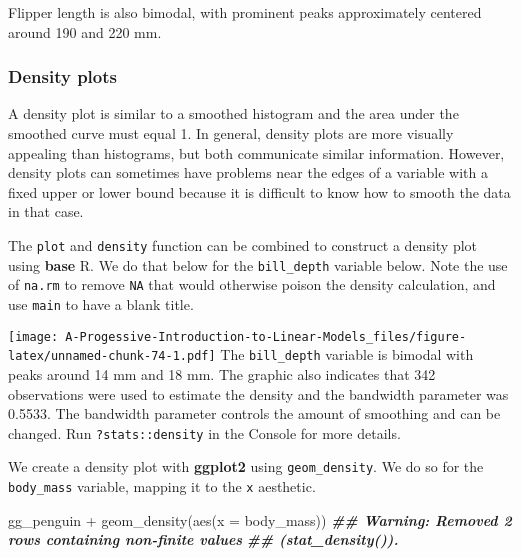 \documentclass[
]{book}
\newenvironment{Shaded}{\begin{snugshade}}{\end{snugshade}}
\newcommand{\AttributeTok}[1]{\textcolor[rgb]{0.77,0.63,0.00}{#1}}
\newcommand{\ConstantTok}[1]{\textcolor[rgb]{0.00,0.00,0.00}{#1}}
\newcommand{\DocumentationTok}[1]{\textcolor[rgb]{0.56,0.35,0.01}{\textbf{\textit{#1}}}}
\newcommand{\FunctionTok}[1]{\textcolor[rgb]{0.00,0.00,0.00}{#1}}
\newcommand{\NormalTok}[1]{#1}
\newcommand{\SpecialCharTok}[1]{\textcolor[rgb]{0.00,0.00,0.00}{#1}}
\newcommand{\StringTok}[1]{\textcolor[rgb]{0.31,0.60,0.02}{#1}}
\theoremstyle{definition}
\theoremstyle{definition}
\theoremstyle{definition}
\theoremstyle{definition}
\theoremstyle{remark}
\begin{document}
Flipper length is also bimodal, with prominent peaks approximately centered around 190 and 220 mm.

\hypertarget{density-plots}{%
\subsubsection{Density plots}\label{density-plots}}

A density plot is similar to a smoothed histogram and the area under the smoothed curve must equal 1. In general, density plots are more visually appealing than histograms, but both communicate similar information. However, density plots can sometimes have problems near the edges of a variable with a fixed upper or lower bound because it is difficult to know how to smooth the data in that case.

The \texttt{plot} and \texttt{density} function can be combined to construct a density plot using \textbf{base} R. We do that below for the \texttt{bill\_depth} variable below. Note the use of \texttt{na.rm} to remove \texttt{NA} that would otherwise poison the density calculation, and use \texttt{main} to have a blank title.

\begin{Shaded}
\end{Shaded}

\texttt{[image: A-Progessive-Introduction-to-Linear-Models\_files/figure-latex/unnamed-chunk-74-1.pdf]}
The \texttt{bill\_depth} variable is bimodal with peaks around 14 mm and 18 mm. The graphic also indicates that 342 observations were used to estimate the density and the bandwidth parameter was 0.5533. The bandwidth parameter controls the amount of smoothing and can be changed. Run \texttt{?stats::density} in the Console for more details.

We create a density plot with \textbf{ggplot2} using \texttt{geom\_density}. We do so for the \texttt{body\_mass} variable, mapping it to the \texttt{x} aesthetic.

\begin{Shaded}
\begin{Highlighting}[]
\NormalTok{gg\_penguin }\SpecialCharTok{+} \FunctionTok{geom\_density}\NormalTok{(}\FunctionTok{aes}\NormalTok{(}\AttributeTok{x =}\NormalTok{ body\_mass))}
\DocumentationTok{\#\# Warning: Removed 2 rows containing non{-}finite values}
\DocumentationTok{\#\# (\textasciigrave{}stat\_density()\textasciigrave{}).}
\end{Highlighting}
\end{Shaded}
\end{document}
